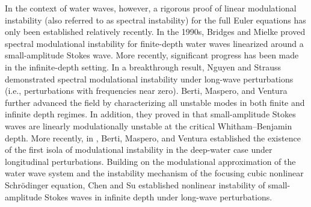 \documentclass[12pt]{amsart}
\theoremstyle{remark}
\theoremstyle{definition}
\numberwithin{equation}{section}
\begin{document}
In the context of water waves, however, a rigorous proof of linear modulational instability (also referred to as spectral instability) for the full Euler equations has only been established relatively recently. 
In the 1990s, Bridges and Mielke \cite{BM95} proved spectral modulational instability for finite-depth water waves linearized around a small-amplitude Stokes wave.
More recently, significant progress has been made in the infinite-depth setting. 
In a breakthrough result, Nguyen and Strauss \cite{NS24} demonstrated spectral modulational instability under long-wave perturbations (i.e., perturbations with frequencies near zero).
Berti, Maspero, and Ventura \cite{BMV22, BMV23} further advanced the field by characterizing all unstable modes in both finite and infinite depth regimes. 
 In addition, they proved in \cite{BMV24} that small-amplitude Stokes waves are linearly modulationally unstable at the critical Whitham–Benjamin depth. 
 More recently, in \cite{BMV25}, Berti, Maspero, and Ventura established the existence of the first isola of modulational instability in the deep-water case under longitudinal perturbations. 
 Building on the modulational approximation of the water wave system and the instability mechanism of the focusing cubic nonlinear Schr\"{o}dinger equation, Chen and Su \cite{MR4627323} established nonlinear instability of small-amplitude Stokes waves in infinite depth under long-wave perturbations.
\end{document}
